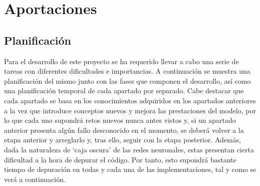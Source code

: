 \chapter{Aportaciones}

\section{Planificación}

Para el desarrollo de este proyecto se ha requerido llevar a cabo una serie de tareas con diferentes dificultades e importancias. A continuación se muestra una planificación del mismo junto con las fases que componen el desarrollo, así como una planificación temporal de cada apartado por separado. Cabe destacar que cada apartado se basa en los conocimientos adquiridos en los apartados anteriores a la vez que introduce conceptos nuevos y mejora las prestaciones del modelo, por lo que cada uno supondrá retos nuevos nunca antes vistos y, si un apartado anterior presenta algún fallo desconocido en el momento, se deberá volver a la etapa anterior y arreglarlo y, tras ello, seguir con la etapa posterior. Además, dada la naturaleza de `caja oscura' de las redes neuronales, estas presentan cierta dificultad a la hora de depurar el código. Por tanto, esto supondrá bastante tiempo de depuración en todas y cada una de las implementaciones, tal y como se verá a continuación.

